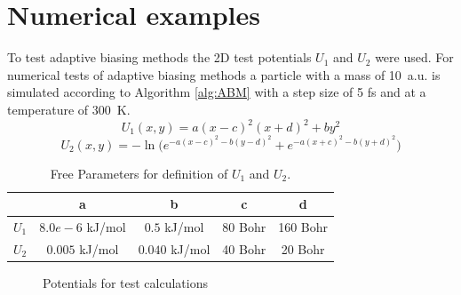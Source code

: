 \section{Numerical examples}
\label{sec:num examples}

To test adaptive biasing methods the 2D test potentials $U_1$ and $U_2$ were used. For numerical tests of adaptive biasing methods a particle with a mass of 10~a.u. is simulated according to Algorithm \ref{alg:ABM} with a step size of 5 fs and at a temperature of 300~K.
\begin{equation}
  U_1(x,y) = a(x-c)^2(x+d)^2 + by^2 \label{eq:U1}
\end{equation}
\begin{equation}
  U_2(x,y) = -\ln\bigl( e^{-a(x-c)^2 - b(y-d)^2} + e^{-a(x+c)^2 - b(y+d)^2} \bigr) \label{eq:U2S}
\end{equation}
\begin{table}[H]
        \centering
        \caption{Free Parameters for definition of $U_1$ and $U_2$.}
        \begin{tabular}{ c | c  c  c  c }
                & a & b & c & d   \\
                \hline
                $U_1$  & $8.0e-6$ kJ/mol & $0.5$ kJ/mol & 80 Bohr & 160 Bohr \\
                $U_2$  & $0.005$ kJ/mol  & $0.040$ kJ/mol & 40 Bohr & 20 Bohr \\
        \end{tabular}
        \label{tab:2D pots}
\end{table}

\begin{figure}[H]
    \centering
    \vspace{-1cm}
    \caption{Potentials for test calculations}
\label{fig:ABF}%
\end{figure}
